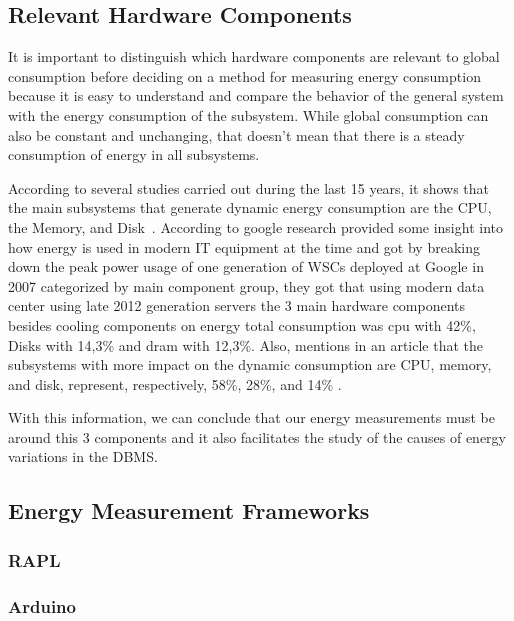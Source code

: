 \subsection{Relevant Hardware Components}
\label{relevant}
It is important to distinguish which hardware components are relevant to global consumption before deciding on a method for measuring energy consumption because it is easy to understand and compare the behavior of the general system with the energy consumption of the subsystem. While global consumption can also be constant and unchanging, that doesn't mean that there is a steady consumption of energy in all subsystems.

According to several studies carried out during the last 15 years, it shows that the main subsystems that generate dynamic energy consumption are the CPU, the Memory, and Disk~\cite{portela2016}. According to google research \cite{google} provided some insight into how energy is used in modern IT equipment at the time and got by breaking down the peak power usage of one generation of WSCs deployed at Google in 2007 categorized by main component group, they got that using modern data center using late 2012 generation servers the 3 main hardware components besides cooling components on energy total consumption was \gls{cpu} with 42\%, Disks with 14,3\% and \gls{dram} with 12,3\%. Also, \citeauthor{kensal} mentions in an article that the subsystems with more impact on the dynamic consumption are CPU, memory, and disk, represent, respectively, 58\%, 28\%, and 14\% .

With this information, we can conclude that our energy measurements must be around this 3 components and it also facilitates the study of the causes of energy variations in the DBMS. 




\subsection{Energy Measurement Frameworks}
\label{energyframe}

\subsubsection{RAPL}
\label{sc:RAPL}


\subsubsection{Arduino}
\label{sc:Arduino}

